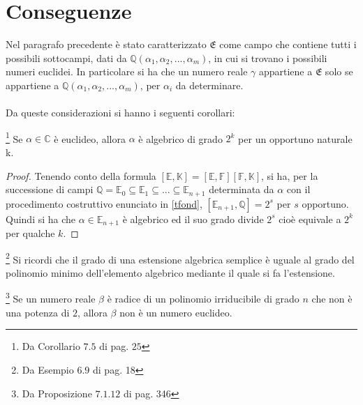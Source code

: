 \section{Conseguenze}

Nel paragrafo precedente è stato caratterizzato $\mathfrak{E}$ come campo che contiene tutti i possibili sottocampi, dati da $\mathbb{Q}(\alpha_1, \alpha_2, ... , \alpha_m)$, in cui si trovano i possibili numeri euclidei.
In particolare si ha che un numero reale $\gamma$ appartiene a $\mathfrak{E}$ solo se appartiene a $\mathbb{Q}(\alpha_1, \alpha_2, ... , \alpha_m)$, per $\alpha_i$ da determinare. 
\\ \\
Da queste considerazioni si hanno i seguenti corollari:

\begin{corollario}\footnote{Da \cite{Procesi} Corollario $7.5$ di pag. $25$} \label{corolla}
Se $\alpha \in \mathbb{C}$ è euclideo, allora $\alpha$ è algebrico di grado $2^k$ per un opportuno naturale k.
\end{corollario}

\begin{proof}
Tenendo conto della formula $[\mathbb{E}, \mathbb{K}]=[\mathbb{E}, \mathbb{F}][\mathbb{F}, \mathbb{K}]$, si ha, per la successione di campi $\mathbb{Q} = \mathbb{E}_0 \subseteq \mathbb{E}_1 \subseteq ... \subseteq  \mathbb{E}_{n+1}$ determinata da $\alpha$ con il procedimento costruttivo enunciato in \ref{tfond}, $[\mathbb{E}_{n+1}, \mathbb{Q}] = 2^s$ per $s$ opportuno. Quindi si ha che $\alpha \in \mathbb{E}_{n+1}$ è algebrico ed il suo grado divide $2^s$ cioè  equivale a $2^k$ per qualche $k$.
\end{proof}

\begin{osservazione}\footnote{Da \cite{Procesi} Esempio $6.9$ di pag. 18}
Si ricordi che il grado di una estensione algebrica semplice è uguale al grado del polinomio minimo dell'elemento algebrico mediante il quale si fa l'estensione.
\end{osservazione}


\begin{corollario}\footnote{Da \cite{cattaneo} Proposizione $7.1.12$ di pag. 346} \label{corollb}
Se un numero reale $\beta$ è radice di un polinomio irriducibile di grado $n$ che non è una potenza di $2$, allora $\beta$ non è un numero euclideo.
\end{corollario}

